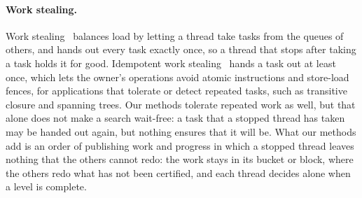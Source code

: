 \paragraph{Work stealing.} Work stealing~\cite{blumofe_workstealing} balances load by letting a thread take tasks from the queues of others, and hands out every task exactly once, so a thread that stops after taking a task holds it for good. Idempotent work stealing~\cite{michael_iws} hands a task out at least once, which lets the owner's operations avoid atomic instructions and store-load fences, for applications that tolerate or detect repeated tasks, such as transitive closure and spanning trees. Our methods tolerate repeated work as well, but that alone does not make a search wait-free: a task that a stopped thread has taken may be handed out again, but nothing ensures that it will be. What our methods add is an order of publishing work and progress in which a stopped thread leaves nothing that the others cannot redo: the work stays in its bucket or block, where the others redo what has not been certified, and each thread decides alone when a level is complete.
